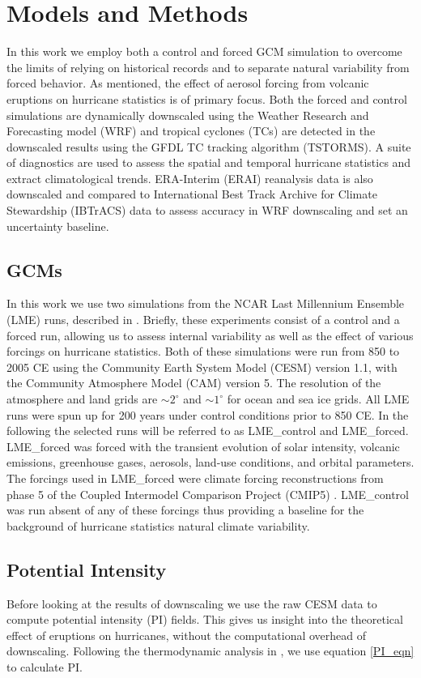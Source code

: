 \section{Models and Methods}
\label{methods}
In this work we employ both a control and forced GCM simulation to overcome the limits of relying on historical records and to separate natural variability from forced behavior. As mentioned, the effect of aerosol forcing from volcanic eruptions on hurricane statistics is of primary focus. Both the forced and control simulations are dynamically downscaled using the Weather Research and Forecasting model (WRF) and tropical cyclones (TCs) are detected in the downscaled results using the GFDL TC tracking algorithm (TSTORMS). A suite of diagnostics are used to assess the spatial and temporal hurricane statistics and extract climatological trends. ERA-Interim (ERAI) reanalysis data is also downscaled and compared to International Best Track Archive for Climate Stewardship (IBTrACS) data to assess accuracy in WRF downscaling and set an uncertainty baseline.
\subsection{GCMs}
In this work we use two simulations from the NCAR Last Millennium Ensemble (LME) runs, described in \cite{gcm_lme}. Briefly, these experiments consist of a control and a forced run, allowing us to assess internal variability as well as the effect of various forcings on hurricane statistics. Both of these simulations were run from 850 to 2005 CE using the Community Earth System Model (CESM) version 1.1, with the Community Atmosphere Model (CAM) version 5. The resolution of the atmosphere and land grids are $\sim2^\circ$ and $\sim1^\circ$ for ocean and sea ice grids. All LME runs were spun up for 200 years under control conditions prior to 850 CE. In the following the selected runs will be referred to as LME_{control} and LME_{forced}. LME_{forced} was forced with the transient evolution of solar intensity, volcanic emissions, greenhouse gases, aerosols, land-use conditions, and orbital parameters. The forcings used in LME_{forced} were climate forcing reconstructions from phase 5 of the Coupled Intermodel Comparison Project (CMIP5) \cite{gmd-4-33-2011}. LME_{control} was run absent of any of these forcings thus providing a baseline for the background of hurricane statistics natural climate variability. 

\subsection{Potential Intensity}
Before looking at the results of downscaling we use the raw CESM data to compute potential intensity (PI) fields. This gives us insight into the theoretical effect of eruptions on hurricanes, without the computational overhead of downscaling. Following the thermodynamic analysis in \cite{pi_ke}, we use equation \ref{PI_eqn} to calculate PI.

